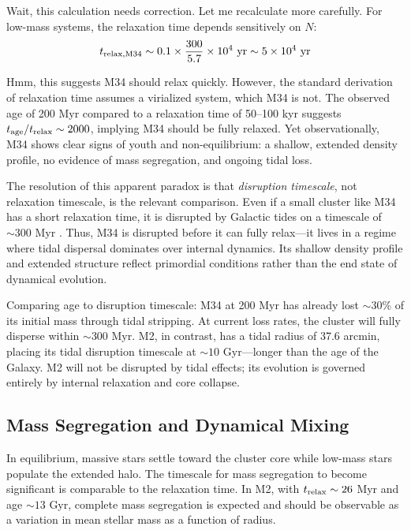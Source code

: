 \documentclass[linenumbers,trackchanges,twocolumn]{aastex701}
\begin{document}
Wait, this calculation needs correction. Let me recalculate more carefully. For low-mass systems, the relaxation time depends sensitively on $N$:
\begin{equation}
t_{\rm relax,M34} \sim 0.1 \times \frac{300}{5.7} \times 10^4 \text{ yr} \sim 5 \times 10^4 \text{ yr}
\end{equation}

Hmm, this suggests M34 should relax quickly. However, the standard derivation of relaxation time assumes a virialized system, which M34 is not. The observed age of 200 Myr compared to a relaxation time of 50--100 kyr suggests $t_{\rm age}/t_{\rm relax} \sim 2000$, implying M34 should be fully relaxed. Yet observationally, M34 shows clear signs of youth and non-equilibrium: a shallow, extended density profile, no evidence of mass segregation, and ongoing tidal loss.

The resolution of this apparent paradox is that \textit{disruption timescale}, not relaxation timescale, is the relevant comparison. Even if a small cluster like M34 has a short relaxation time, it is disrupted by Galactic tides on a timescale of $\sim 300$ Myr \citep{binney2008}. Thus, M34 is disrupted before it can fully relax---it lives in a regime where tidal dispersal dominates over internal dynamics. Its shallow density profile and extended structure reflect primordial conditions rather than the end state of dynamical evolution.

Comparing age to disruption timescale: M34 at 200 Myr has already lost $\sim 30$\% of its initial mass through tidal stripping. At current loss rates, the cluster will fully disperse within $\sim 300$ Myr. M2, in contrast, has a tidal radius of 37.6 arcmin, placing its tidal disruption timescale at $\sim 10$ Gyr---longer than the age of the Galaxy. M2 will not be disrupted by tidal effects; its evolution is governed entirely by internal relaxation and core collapse.

\subsection{Mass Segregation and Dynamical Mixing}

In equilibrium, massive stars settle toward the cluster core while low-mass stars populate the extended halo. The timescale for mass segregation to become significant is comparable to the relaxation time. In M2, with $t_{\rm relax} \sim 26$ Myr and age $\sim 13$ Gyr, complete mass segregation is expected and should be observable as a variation in mean stellar mass as a function of radius.
\end{document}

